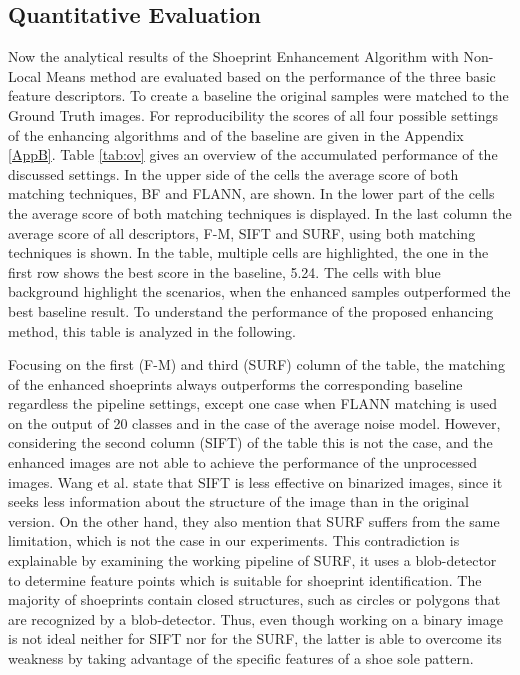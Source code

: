 \documentclass[draft,final]{vutinfth} %
\begin{document}
\subsection{Quantitative Evaluation}

\par
Now the analytical results of the Shoeprint Enhancement Algorithm with Non-Local Means method are evaluated based on the performance of  the three basic feature descriptors.
To create a baseline the original samples were matched to the Ground Truth images.
For reproducibility the scores of all four possible settings  of the enhancing algorithms and of the baseline are given in the Appendix \ref{AppB}.
Table \ref{tab:ov} gives an overview of the accumulated performance of the discussed settings.
In the upper side of the cells the average score of both matching techniques, BF and FLANN, are shown.
In the lower part of the cells the average score of both matching techniques is displayed.
In the last column the average score of all descriptors, F-M, SIFT and SURF, using both matching techniques is shown.
In the table, multiple cells are highlighted, the one in the first row shows the best score in the baseline, 5.24.
The cells with blue background highlight the scenarios, when the enhanced samples outperformed the best baseline result.
To understand the performance of the proposed enhancing method, this table is analyzed in the following.
\par
Focusing on the first (F-M) and third (SURF) column of the table, the matching of the enhanced shoeprints always outperforms the corresponding baseline regardless the pipeline settings, except one case when FLANN matching is used on the output of 20 classes and in the case of the average noise model.
However, considering the second column (SIFT) of the table this is not the case, and the enhanced images are not able to achieve the performance of the unprocessed images.
Wang et al. \cite{wang2017manifold} state that SIFT is less effective on binarized images, since it seeks less information about the structure of the image than in the original version.
On the other hand, they also mention that SURF suffers from the same limitation, which is not the case in our experiments.
This contradiction is explainable by examining the working pipeline of SURF, it uses a blob-detector to determine feature points which is suitable for shoeprint identification.
The majority of shoeprints contain closed structures, such as circles or polygons that are recognized by a blob-detector.
Thus, even though working on a binary image is not ideal neither for SIFT nor for the SURF, the latter is able to overcome its weakness by taking advantage of the specific features of a shoe sole pattern. 
\end{document}
